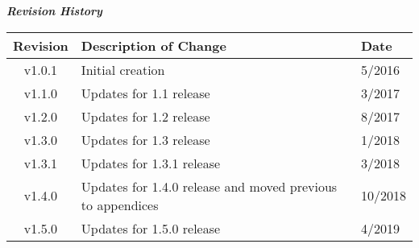 \maketitle
\thispagestyle{empty}
\newpage
{}
	\begin{center}
	\textit{\textbf{Revision History}}
		\begin{table}[H]
		\label{table:revisions} %
			\begin{tabularx}{\textwidth}{|c|X|l|}
			\hline
			\rowcolor{blue}
			\textbf{Revision} & \textbf{Description of Change} & \textbf{Date} \\
		    \hline
			v1.0.1 & Initial creation & 5/2016 \\
			\hline
			v1.1.0 & Updates for 1.1 release & 3/2017 \\
			\hline
			v1.2.0 & Updates for 1.2 release & 8/2017 \\
			\hline
			v1.3.0 & Updates for 1.3 release & 1/2018 \\
			\hline
			v1.3.1 & Updates for 1.3.1 release & 3/2018 \\
			\hline
			v1.4.0 & Updates for 1.4.0 release and moved previous to appendices & 10/2018 \\
			\hline
			v1.5.0 & Updates for 1.5.0 release & 4/2019 \\
			\hline
			\end{tabularx}
		\end{table}
	\end{center}

\newpage

\tableofcontents
\renewcommand\thesection{\Roman{section}}
\renewcommand\thesubsection{\thesection-\arabic{subsection}}
\newpage
{}
